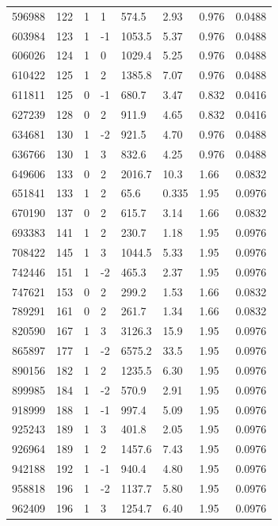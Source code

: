 \documentclass[preview]{standalone}
\begin{document}
{{{{\begin{tabular}{L{1.2cm}C{1.2cm} C{0.3cm}C{0.5cm} C{1.4cm}C{1.4cm} C{1.4cm}C{1.4cm}}
  596988  &   122  & 1     &  1 &  574.5  & 2.93  & 0.976 &  0.0488   \\ 
  603984  &   123  & 1     & -1 &  1053.5  & 5.37  & 0.976 &  0.0488   \\ 
  606026  &   124  & 1     &  0 &  1029.4  & 5.25  & 0.976 &  0.0488   \\ 
  610422  &   125  & 1     &  2 &  1385.8  & 7.07  & 0.976 &  0.0488   \\ 
  611811  &   125  & 0     & -1 &  680.7  & 3.47  & 0.832 &  0.0416   \\ 
  627239  &   128  & 0     &  2 &  911.9  & 4.65  & 0.832 &  0.0416   \\ 
  634681  &   130  & 1     & -2 &  921.5  & 4.70  & 0.976 &  0.0488   \\ 
  636766  &   130  & 1     &  3 &  832.6  & 4.25  & 0.976 &  0.0488   \\ 
  649606  &   133  & 0     &  2 &  2016.7  & 10.3  & 1.66 &  0.0832   \\ 
  651841  &   133  & 1     &  2 &  65.6  & 0.335  & 1.95 &  0.0976   \\ 
  670190  &   137  & 0     &  2 &  615.7  & 3.14  & 1.66 &  0.0832   \\ 
  693383  &   141  & 1     &  2 &  230.7  & 1.18  & 1.95 &  0.0976   \\ 
  708422  &   145  & 1     &  3 &  1044.5  & 5.33  & 1.95 &  0.0976   \\ 
  742446  &   151  & 1     & -2 &  465.3  & 2.37  & 1.95 &  0.0976   \\ 
  747621  &   153  & 0     &  2 &  299.2  & 1.53  & 1.66 &  0.0832   \\ 
  789291  &   161  & 0     &  2 &  261.7  & 1.34  & 1.66 &  0.0832   \\ 
  820590  &   167  & 1     &  3 &  3126.3  & 15.9  & 1.95 &  0.0976   \\ 
  865897  &   177  & 1     & -2 &  6575.2  & 33.5  & 1.95 &  0.0976   \\ 
  890156  &   182  & 1     &  2 &  1235.5  & 6.30  & 1.95 &  0.0976   \\ 
  899985  &   184  & 1     & -2 &  570.9  & 2.91  & 1.95 &  0.0976   \\ 
  918999  &   188  & 1     & -1 &  997.4  & 5.09  & 1.95 &  0.0976   \\ 
  925243  &   189  & 1     &  3 &  401.8  & 2.05  & 1.95 &  0.0976   \\ 
  926964  &   189  & 1     &  2 &  1457.6  & 7.43  & 1.95 &  0.0976   \\ 
  942188  &   192  & 1     & -1 &  940.4  & 4.80  & 1.95 &  0.0976   \\ 
  958818  &   196  & 1     & -2 &  1137.7  & 5.80  & 1.95 &  0.0976   \\ 
  962409  &   196  & 1     &  3 &  1254.7  & 6.40  & 1.95 &  0.0976   \\ 
\hline 
\end{tabular} 

}}}}
\end{document}

